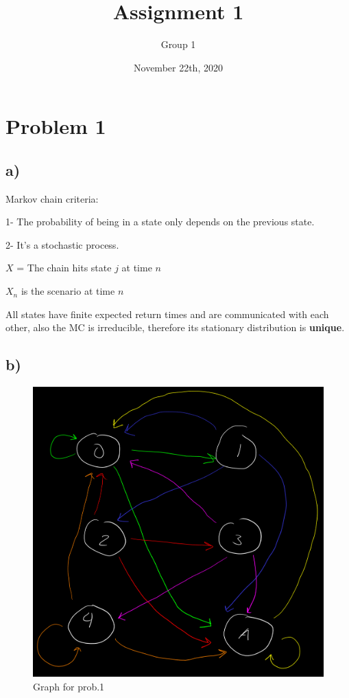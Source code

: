 \documentclass[]{article}
\title{Assignment 1}
\author{Group 1}
\date{November 22th, 2020}
\begin{document}
\maketitle

\hypertarget{problem-1}{%
\section{Problem 1}\label{problem-1}}

\hypertarget{a}{%
\subsection{a)}\label{a}}

Markov chain criteria:

1- The probability of being in a state only depends on the previous
state.

2- It's a stochastic process.

\(X\) = The chain hits state \(j\) at time \(n\)

\(X_{n}\) is the scenario at time \(n\)

All states have finite expected return times and are communicated with
each other, also the MC is irreducible, therefore its stationary
distribution is \textbf{unique}.

\hypertarget{b}{%
\subsection{b)}\label{b}}

\begin{figure}
\centering
\includegraphics{./grafo1.png}
\caption{Graph for prob.1}
\end{figure}
\end{document}
